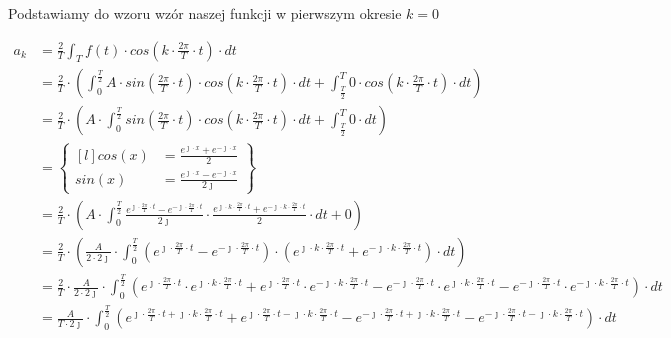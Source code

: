 Podstawiamy do wzoru wzór naszej funkcji w pierwszym okresie $k=0$

\begin{align*}
a_k&=\frac{2}{T}\int_{T}f(t) \cdot cos\left( k \cdot \frac{2\pi}{T} \cdot t\right) \cdot dt\\
&=\frac{2}{T}\cdot\left(\int_{0}^{\frac{T}{2}}A \cdot sin\left( \frac{2\pi}{T} \cdot t\right) \cdot cos\left( k \cdot \frac{2\pi}{T} \cdot t\right) \cdot dt+\int_{\frac{T}{2}}^{T} 0 \cdot cos\left( k \cdot \frac{2\pi}{T} \cdot t\right) \cdot dt\right)\\
&=\frac{2}{T}\cdot\left(A \cdot \int_{0}^{\frac{T}{2}}sin\left( \frac{2\pi}{T} \cdot t\right) \cdot cos\left( k \cdot \frac{2\pi}{T} \cdot t\right) \cdot dt+\int_{\frac{T}{2}}^{T} 0 \cdot dt\right)\\
&=\begin{Bmatrix*}[l]
cos\left(x\right)&=\frac{e^{\jmath \cdot x}+e^{-\jmath \cdot x}}{2}\\
sin\left(x\right)&=\frac{e^{\jmath \cdot x}-e^{-\jmath \cdot x}}{2 \jmath }
\end{Bmatrix*}\\
&=\frac{2}{T}\cdot\left(A \cdot \int_{0}^{\frac{T}{2}} \frac{e^{\jmath \cdot \frac{2\pi}{T} \cdot t}-e^{-\jmath \cdot \frac{2\pi}{T} \cdot t}}{2\jmath} \cdot \frac{e^{\jmath \cdot k \cdot \frac{2\pi}{T} \cdot t}+e^{-\jmath \cdot k \cdot \frac{2\pi}{T} \cdot t}}{2} \cdot dt+0\right)\\
&=\frac{2}{T}\cdot\left(\frac{A}{2\cdot 2\jmath} \cdot \int_{0}^{\frac{T}{2}} \left(e^{\jmath \cdot \frac{2\pi}{T} \cdot t}-e^{-\jmath \cdot \frac{2\pi}{T} \cdot t}\right)\cdot \left(e^{\jmath \cdot k \cdot \frac{2\pi}{T} \cdot t}+e^{-\jmath \cdot k \cdot \frac{2\pi}{T} \cdot t}\right) \cdot dt\right)\\
&=\frac{2}{T} \cdot \frac{A}{2\cdot 2\jmath} \cdot \int_{0}^{\frac{T}{2}}
\left(e^{\jmath \cdot \frac{2\pi}{T} \cdot t} \cdot e^{\jmath \cdot k \cdot \frac{2\pi}{T} \cdot t} + e^{\jmath \cdot \frac{2\pi}{T} \cdot t} \cdot e^{-\jmath \cdot k \cdot \frac{2\pi}{T} \cdot t} - e^{-\jmath \cdot \frac{2\pi}{T} \cdot t} \cdot e^{\jmath \cdot k \cdot \frac{2\pi}{T} \cdot t} - e^{-\jmath \cdot \frac{2\pi}{T} \cdot t} \cdot e^{-\jmath \cdot k \cdot \frac{2\pi}{T} \cdot t} \right) \cdot dt\\
&=\frac{A}{T\cdot 2\jmath} \cdot \int_{0}^{\frac{T}{2}}
\left(e^{\jmath \cdot \frac{2\pi}{T} \cdot t + \jmath \cdot k \cdot \frac{2\pi}{T} \cdot t} + e^{\jmath \cdot \frac{2\pi}{T} \cdot t -\jmath \cdot k \cdot \frac{2\pi}{T} \cdot t} - e^{-\jmath \cdot \frac{2\pi}{T} \cdot t+ \jmath \cdot k \cdot \frac{2\pi}{T} \cdot t} - e^{-\jmath \cdot \frac{2\pi}{T} \cdot t -\jmath \cdot k \cdot \frac{2\pi}{T} \cdot t} \right) \cdot dt\\

\end{align*}

